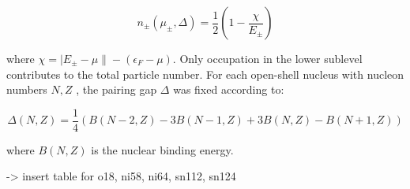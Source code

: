 \begin{equation}
    n_{\pm}(\mu_{\pm},\Delta) = \frac{1}{2}\left(
    1-\frac{\chi}{E_{\pm}}\right)
\end{equation}

where $\chi = |E_{\pm}-\mu\| - (\epsilon_{F} - \mu)$. Only occupation in the
lower sublevel contributes to the total particle number. For each open-shell
nucleus with nucleon numbers $N, Z$ , the pairing gap $\Delta$ was fixed according to:

\begin{equation}
    \Delta(N,Z) = \frac{1}{4}\left(B(N-2,Z)-3B(N-1,Z) + 3B(N,Z)-B(N+1,Z)\right)
\end{equation}

where $B(N,Z)$ is the nuclear binding energy.

-> insert table for o18, ni58, ni64, sn112, sn124



\afterpage{\clearpage}
